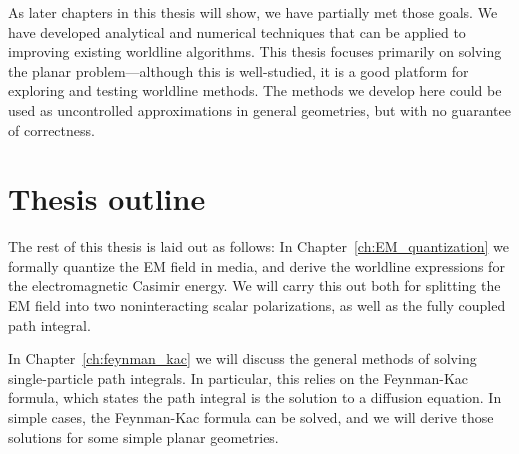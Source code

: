 As later chapters in this thesis will show, we have partially met those goals.  We have developed analytical
and numerical techniques that can be applied to improving existing worldline algorithms.
This thesis focuses primarily on solving the planar problem---although this is well-studied,
it is a good platform for exploring and testing worldline methods.  
The methods we develop here could be used as uncontrolled approximations in general geometries, but with
no guarantee of correctness.  

\section{Thesis outline}

The rest of this thesis is laid out as follows: 
In Chapter~\ref{ch:EM_quantization} we formally quantize
the EM field in media, and derive the worldline expressions for the electromagnetic Casimir energy.
We will carry this out both for splitting the EM field into two noninteracting scalar polarizations,
as well as the fully coupled path integral.

In Chapter~\ref{ch:feynman_kac} we will discuss the general methods of solving single-particle path 
integrals.  In particular, this relies on the Feynman-Kac formula, which states the path integral
 is the solution to a diffusion equation.  In simple cases, the Feynman-Kac formula can be solved,
and we will derive those solutions for some simple planar geometries. 

